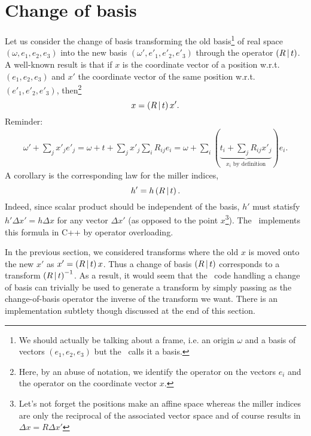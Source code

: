 \documentclass[11pt]{article}
\begin{document}
\section{Change of basis}

Let us consider the change of basis transforming the old basis\footnote{We should actually be talking about a frame, i.e. an origin $\omega$ and a basis of vectors $(e_1, e_2, e_3)$ but the \cctbx\ calls it a basis.} of real space $(\omega, e_1, e_2, e_3)$ into the new basis $(\omega', e'_1, e'_2, e'_3)$ through the operator $\left( R\,\vert\, t \right)$. A well-known result is that if $x$ is the coordinate vector of a position w.r.t. $(e_1, e_2, e_3)$ and $x'$ the coordinate vector of the same position w.r.t. $(e'_1, e'_2, e'_3)$, then\footnote{Here, by an abuse of notation, we identify the operator on the vectors $e_i$ and the operator on the coordinate vector $x$.}
\begin{equation}
x = \left( R\,\vert\, t \right)x'.
\label{eqn:change::of::basis::position}
\end{equation}
Reminder:
\begin{align}
\omega' + \sum_j x'_j e'_j = \omega + t + \sum_j x'_j \sum_i R_{ij} e_i = \omega + \sum_i (\underbrace{t_i + \sum_j R_{ij} x'_j}_{x_i \text{ by definition}})e_i. \nonumber
\end{align}
A corollary is the corresponding law for the miller indices,
\begin{equation}
h' = h\left( R\,\vert\, t \right).
\end{equation}
Indeed, since scalar product should be independent of the basis, $h'$ must statisfy $h'\Delta x' = h\Delta x$ for any vector $\Delta x'$ (as opposed to the point $x$\footnote{Let's not forget the positions make an affine space whereas the miller indices are only the reciprocal of the associated vector space and of course  results in $\Delta x = R \Delta x'$}). The \cctbx\ implements this formula in C++ by operator overloading.

In the previous section, we considered transforms where the old $x$ is moved onto the new $x'$ as $x' = \left( R\,\vert\, t \right) x$. Thus a change of basis $\left( R\,\vert\, t \right)$ corresponds to a transform $\left( R\,\vert\, t \right)^{-1}$. As a result, it would seem that the \cctbx\ code handling a change of basis can trivially be used to generate a transform by simply passing as the change-of-basis operator the inverse of the transform we want. There is an implementation subtlety though discussed at the end of this section.
\end{document}
